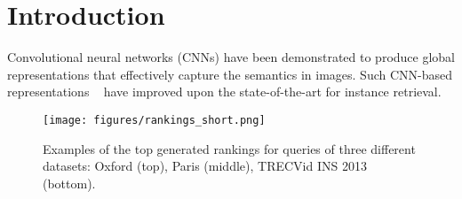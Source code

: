 \documentclass{sig-arxiv}
\begin{document}




\section{Introduction}\label{1_intro}%
Convolutional neural networks (CNNs) have been demonstrated to produce global representations that effectively capture the semantics in images. Such CNN-based representations ~\cite{babenko2015,neuralcodes,cnnofftheshelf,razavian2015,tolias2015,xie2015image} have improved upon the state-of-the-art for instance retrieval.

\begin{figure}
  \texttt{[image: figures/rankings\_short.png]}
  \caption{Examples of the top generated rankings for queries of three different datasets: Oxford (top), Paris (middle), TRECVid INS 2013 (bottom).}
  \label{fig:rankings}
\end{figure}%
\end{document}
